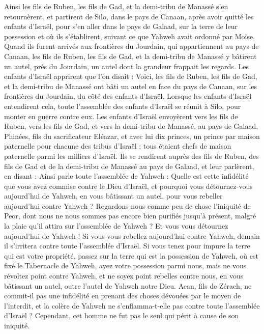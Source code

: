 \begin{multicols}{2}
Ainsi les fils de Ruben, les fils de Gad, et la demi-tribu de Manassé s’en retournèrent, et partirent de Silo, dans le pays de Canaan, après avoir quitté les enfants d’Israël, pour s’en aller dans le pays de Galaad, sur la terre de leur possession et où ils s’établirent, suivant ce que Yahweh avait ordonné par Moïse.
Quand ils furent arrivés aux frontières du Jourdain, qui appartiennent au pays de Canaan, les fils de Ruben, les fils de Gad, et la demi-tribu de Manassé y bâtirent un autel, près du Jourdain, un autel dont la grandeur frappait les regards.
Les enfants d’Israël apprirent que l’on disait : Voici, les fils de Ruben, les fils de Gad, et la demi-tribu de Manassé ont bâti un autel en face du pays de Canaan, sur les frontières du Jourdain, du côté des enfants d’Israël.
Lorsque les enfants d’Israël entendirent cela, toute l’assemblée des enfants d’Israël se réunit à Silo, pour monter en guerre contre eux.
Les enfants d’Israël envoyèrent vers les fils de Ruben, vers les fils de Gad, et vers la demi-tribu de Manassé, au pays de Galaad, Phinées, fils du sacrificateur Eléazar,
et avec lui dix princes, un prince par maison paternelle pour chacune des tribus d’Israël ; tous étaient chefs de maison paternelle parmi les milliers d’Israël.
Ils se rendirent auprès des fils de Ruben, des fils de Gad et de la demi-tribu de Manassé au pays de Galaad, et leur parlèrent, en disant :
Ainsi parle toute l’assemblée de Yahweh : Quelle est cette infidélité que vous avez commise contre le Dieu d’Israël, et pourquoi vous détournez-vous aujourd’hui de Yahweh, en vous bâtissant un autel, pour vous rebeller aujourd’hui contre Yahweh ?
Regardons-nous comme peu de chose l’iniquité de Peor\FTNT{}, dont nous ne nous sommes pas encore bien purifiés jusqu’à présent, malgré la plaie qu’il attira sur l’assemblée de Yahweh ?
Et vous vous détournez aujourd’hui de Yahweh ! Si vous vous rebellez aujourd’hui contre Yahweh, demain il s’irritera contre toute l’assemblée d’Israël.
Si vous tenez pour impure la terre qui est votre propriété, passez sur la terre qui est la possession de Yahweh, où est fixé le Tabernacle de Yahweh, ayez votre possession parmi nous, mais ne vous révoltez point contre Yahweh, et ne soyez point rebelles contre nous, en vous bâtissant un autel, outre l’autel de Yahweh notre Dieu.
Acan\FTNT{}, fils de Zérach, ne commit-il pas une infidélité en prenant des choses dévouées par le moyen de l'interdit, et la colère de Yahweh ne s’enflamma-t-elle pas contre toute l’assemblée d’Israël ? Cependant, cet homme ne fut pas le seul qui périt à cause de son iniquité.

\end{multicols}
